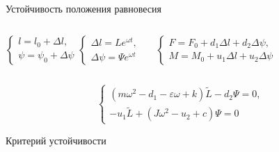 \documentclass[ignoreonframetext,unicode]{beamer}
\begin{document}
\begin{frame}{Устойчивость положения равновесия}
	\vspace*{-2mm}
	\begin{columns}
		
	\begin{block}{}
		\vspace*{0mm}
		\begin{equation*}
			\begin{cases}
				l = l_0 + \Delta{l}, \\
				\psi = \psi_0 + \Delta{\psi}
			\end{cases}
			\begin{cases}
			\Delta{l} = L e^{\omega t}, \\
			\Delta{\psi} = \Psi e^{\omega t}
			\end{cases}
			\label{kjdkjsnadkjadsbafabjb}
		\end{equation*}
	\end{block}

	\begin{block}{}
		\vspace*{0mm}
		\begin{equation*}
			\begin{cases}
			F = F_0 + d_1 \Delta{l} + d_2 \Delta{\psi}, \\
			M = M_0 + u_1 \Delta{l} + u_2 \Delta{\psi}
			\end{cases}
			\label{kjdkjsasdsanadkjadsbafabjb}
		\end{equation*}
	\end{block}
	
	\end{columns}

\begin{block}{}
	\vspace*{-2mm}
	\begin{equation*}
		\begin{cases}
			\left( m \omega^2 - d_1 - \varepsilon \omega + k \right) \tilde{L} - d_2 \Psi = 0, \\
			- u_1 \tilde{L} + \left(J \omega^2 - u_2 + c \right) \Psi 	 = 0
		\end{cases}
		\label{kjdkjsnadkjddadsbafabjb}
	\end{equation*}
\end{block}

\vspace*{-2mm}
\begin{block}{Критерий устойчивости}
	\vspace*{-2mm}
	\begin{columns}
		

\end{columns}
\end{block}
\end{frame}
\end{document}
